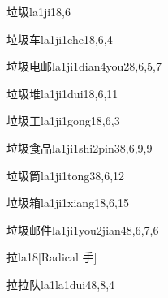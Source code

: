 
\begin{verbete}{垃圾}{la1ji1}{8,6}
\end{verbete}

\begin{verbete}{垃圾车}{la1ji1che1}{8,6,4}
\end{verbete}

\begin{verbete}{垃圾电邮}{la1ji1dian4you2}{8,6,5,7}
\end{verbete}

\begin{verbete}{垃圾堆}{la1ji1dui1}{8,6,11}
\end{verbete}

\begin{verbete}{垃圾工}{la1ji1gong1}{8,6,3}
\end{verbete}

\begin{verbete}{垃圾食品}{la1ji1shi2pin3}{8,6,9,9}
\end{verbete}

\begin{verbete}{垃圾筒}{la1ji1tong3}{8,6,12}
\end{verbete}

\begin{verbete}{垃圾箱}{la1ji1xiang1}{8,6,15}
\end{verbete}

\begin{verbete}{垃圾邮件}{la1ji1you2jian4}{8,6,7,6}
\end{verbete}

\begin{verbete}{拉}{la1}{8}[Radical 手]
\end{verbete}

\begin{verbete}{拉拉队}{la1la1dui4}{8,8,4}
\end{verbete}


